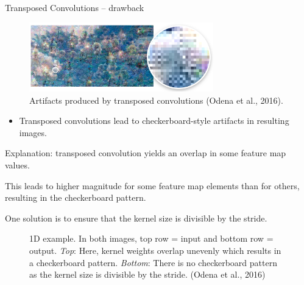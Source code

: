 \begin{vbframe}{Transposed Convolutions -- drawback}
    \begin{figure}
        \centering
        \includegraphics[width=8cm]{plots/05_conv_variations/transpose/transpose_artifact.png}
        \caption{Artifacts produced by transposed convolutions (Odena et al., 2016).}
    \end{figure}
    \begin{itemize}
        \item Transposed convolutions lead to checkerboard-style artifacts in resulting images.
    \end{itemize}
    
\framebreak

\begin{itemize}
        \small{\item Explanation: transposed convolution yields an overlap in some feature map values.
        \item This leads to higher magnitude for some feature map elements than for others, resulting in the checkerboard pattern.
        \item One solution is to ensure that the kernel size is divisible by the stride.
        }
    \end{itemize}
        \begin{figure}
            \centering
            \caption{\footnotesize{1D example. In both images, top row = input and bottom row = output. \textit{Top}: Here, kernel weights overlap unevenly which results in a checkerboard pattern. \textit{Bottom}: There is no checkerboard pattern as the kernel size is divisible by the stride. (Odena et al., 2016)}}
        \end{figure}
       

\end{vbframe}
